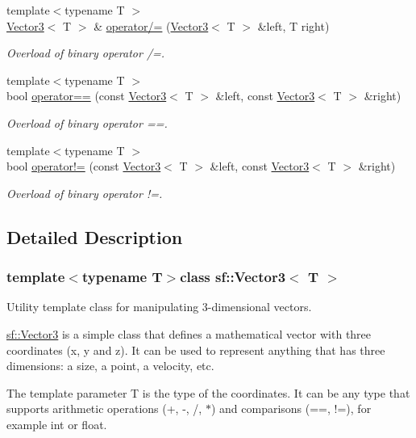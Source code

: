 \begin{DoxyCompactItemize}
{\footnotesize template$<$typename T $>$ }\\\hyperlink{classsf_1_1_vector3}{Vector3}$<$ T $>$ \& \hyperlink{classsf_1_1_vector3_a8995a700f9dffccc6dddb3696ae17b64}{operator/=} (\hyperlink{classsf_1_1_vector3}{Vector3}$<$ T $>$ \&left, T right)
\begin{DoxyCompactList}\small\item\em Overload of binary operator /=. \end{DoxyCompactList}\item 
{\footnotesize template$<$typename T $>$ }\\bool \hyperlink{classsf_1_1_vector3_a388d72db973306a35ba467016b3dee30}{operator==} (const \hyperlink{classsf_1_1_vector3}{Vector3}$<$ T $>$ \&left, const \hyperlink{classsf_1_1_vector3}{Vector3}$<$ T $>$ \&right)
\begin{DoxyCompactList}\small\item\em Overload of binary operator ==. \end{DoxyCompactList}\item 
{\footnotesize template$<$typename T $>$ }\\bool \hyperlink{classsf_1_1_vector3_a608500d1ad3b78082cb5bb4356742bd4}{operator!=} (const \hyperlink{classsf_1_1_vector3}{Vector3}$<$ T $>$ \&left, const \hyperlink{classsf_1_1_vector3}{Vector3}$<$ T $>$ \&right)
\begin{DoxyCompactList}\small\item\em Overload of binary operator !=. \end{DoxyCompactList}\end{DoxyCompactItemize}


\subsection{Detailed Description}
\subsubsection*{template$<$typename T$>$class sf\+::\+Vector3$<$ T $>$}

Utility template class for manipulating 3-\/dimensional vectors. 

\hyperlink{classsf_1_1_vector3}{sf\+::\+Vector3} is a simple class that defines a mathematical vector with three coordinates (x, y and z). It can be used to represent anything that has three dimensions\+: a size, a point, a velocity, etc.

The template parameter T is the type of the coordinates. It can be any type that supports arithmetic operations (+, -\/, /, $\ast$) and comparisons (==, !=), for example int or float.

